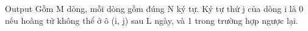 Output
Gồm M dòng, mỗi dòng gồm đúng N ký tự. Ký tự thứ j của dòng i là 0 nếu hoàng tử không thể ở ô (i, j) sau L ngày, và 1 trong trường hợp ngược lại.